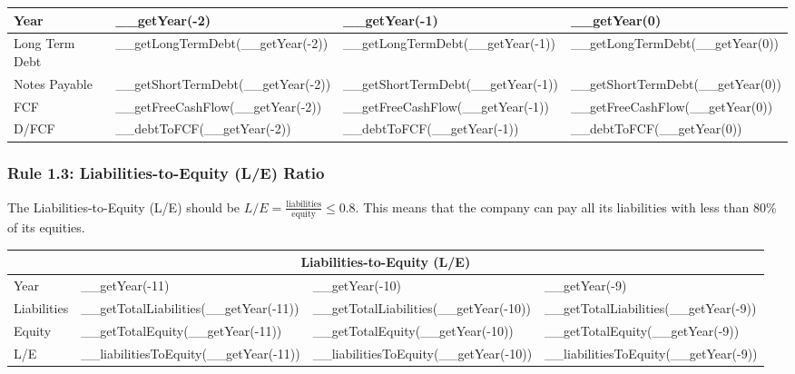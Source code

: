 \begin{tabularx}{\textwidth}{|X|X|X|X|}
 \hline
 Year                       & __getYear(-2)                           & __getYear(-1)                           & __getYear(0)                     \\
 \hline
 Long Term Debt             & __getLongTermDebt(__getYear(-2))        & __getLongTermDebt(__getYear(-1))        & __getLongTermDebt(__getYear(0))  \\
 Notes Payable              & __getShortTermDebt(__getYear(-2))       & __getShortTermDebt(__getYear(-1))       & __getShortTermDebt(__getYear(0)) \\
 FCF                        & __getFreeCashFlow(__getYear(-2))        & __getFreeCashFlow(__getYear(-1))        & __getFreeCashFlow(__getYear(0))  \\
 \rowcolor{lightgray} D/FCF & __debtToFCF(__getYear(-2))              & __debtToFCF(__getYear(-1))              & __debtToFCF(__getYear(0))        \\
 \hline
\end{tabularx}

\subsubsection{{Rule 1.3: Liabilities-to-Equity (L/E) Ratio}}

The Liabilities-to-Equity (L/E) should be $L/E = \frac{\text{liabilities}}{\text{equity}} \leq 0.8$.
This means that the company can pay all its liabilities with less than 80\% of its
equities.\\

\begin{tabularx}{\textwidth}{|X|X|X|X|}
 \hline
 \multicolumn{4}{|c|}{Liabilities-to-Equity (L/E)} \\
 \hline
 Year                     & __getYear(-11)                        & __getYear(-10)                        & __getYear(-9)                        \\
 \hline
 Liabilities              & __getTotalLiabilities(__getYear(-11)) & __getTotalLiabilities(__getYear(-10)) & __getTotalLiabilities(__getYear(-9)) \\
 Equity                   & __getTotalEquity(__getYear(-11))      & __getTotalEquity(__getYear(-10))      & __getTotalEquity(__getYear(-9))      \\
 \rowcolor{lightgray} L/E & __liabilitiesToEquity(__getYear(-11)) & __liabilitiesToEquity(__getYear(-10)) & __liabilitiesToEquity(__getYear(-9)) \\
 \hline
\end{tabularx}\\

